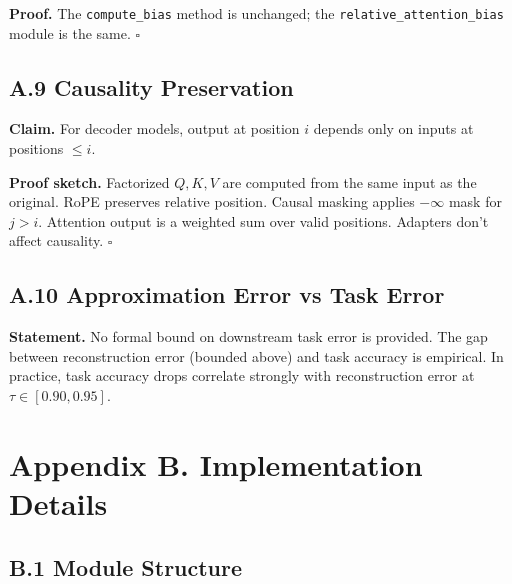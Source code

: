 \textbf{Proof.} The \texttt{compute\_bias} method is unchanged; the \texttt{relative\_attention\_bias} 
module is the same. $\square$

\subsection{A.9 Causality Preservation}

\textbf{Claim.} For decoder models, output at position $i$ depends only on inputs 
at positions $\leq i$.

\textbf{Proof sketch.} Factorized $Q, K, V$ are computed from the same input as 
the original. RoPE preserves relative position. Causal masking applies 
$-\infty$ mask for $j > i$. Attention output is a weighted sum over valid 
positions. Adapters don't affect causality. $\square$

\subsection{A.10 Approximation Error vs Task Error}

\textbf{Statement.} No formal bound on downstream task error is provided. The gap 
between reconstruction error (bounded above) and task accuracy is 
empirical. In practice, task accuracy drops correlate strongly with 
reconstruction error at $\tau \in [0.90, 0.95]$.


\section{Appendix B. Implementation Details}

\subsection{B.1 Module Structure}

